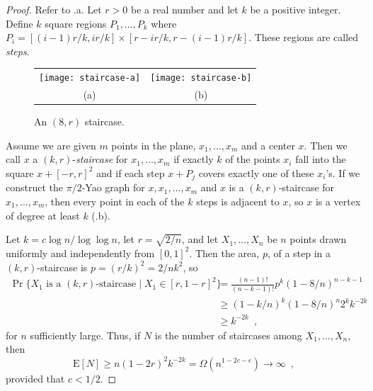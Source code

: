 \documentclass[lotsofwhite,charterfonts]{patmorin}
\newcommand{\EXP}{\mathrm{E}}
\begin{document}
\begin{proof}
Refer to .a.  Let $r>0$ be a real number and let $k$ be
a positive integer.  Define $k$ square regions $P_1,\ldots,P_k$ where
$P_i = [(i-1)r/k,ir/k]\times [r-ir/k,r-(i-1)r/k]$.  These regions are
called \emph{steps}.

\begin{figure}
  \begin{center}
    \begin{tabular}{cc}
      \texttt{[image: staircase-a]} & \texttt{[image: staircase-b]} \\
      (a) & (b)
    \end{tabular}
  \end{center}
  \caption{An $(8,r)$ staircase.}
\end{figure}

Assume we are given $m$ points in the plane, $x_1,\ldots,x_m$ and a center
$x$.  Then we call $x$ a $(k,r)$-\emph{staircase} for $x_1 , \ldots , x_m$
if exactly $k$ of the points $x_i$ fall into the square $x+[-r,r]^2$ and if
each step $x+P_j$ covers exactly one of these $x_i$'s.
If we construct the $\pi/2$-Yao graph for $x,x_1,\ldots,x_m$ and $x$ is a
$(k,r)$-staircase for $x_1,\ldots,x_m$, then every point in each of the $k$
steps is adjacent to $x$, so $x$ is a vertex of degree at least $k$
(.b).

Let $k=c\log n/\log \log n$, let $r=\sqrt{2/n}$, and let $X_1,\ldots,X_n$
be $n$ points drawn uniformly and independently from $[0,1]^2$.  Then the
area, $p$, of a step in a $(k,r)$-staircase is $p=(r/k)^2=2/nk^2$, so
\[
  \begin{aligned}
     \Pr\{\mbox{$X_1$ is a $(k,r)$-staircase} \mid X_1\in[r,1-r]^2\}
        & = \frac{(n-1)!}{(n-k-1)!} p^k (1-8/n)^{n-k-1} \\
        & \ge (1-k/n)^k (1-8/n)^{n} 2^k k^{-2k} \\
        & \ge k^{-2k} \enspace ,
  \end{aligned}
\]
for $n$ sufficiently large.
Thus, if $N$ is the number of staircases among $X_1,\ldots,X_n$, then
\[
  \EXP[N]\ge n(1-2r)^2k^{-2k}
    = \Omega(n^{1-2c-\epsilon})
      \rightarrow\infty \enspace ,
\]
provided that $c < 1/2$.


\end{proof}
\end{document}
